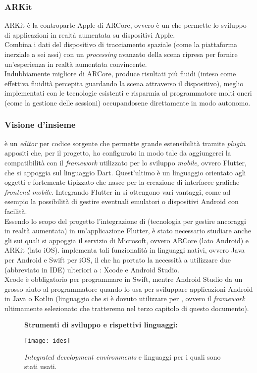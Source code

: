 \subsubsection{ARKit}
ARKit è la controparte Apple di ARCore, ovvero è un \sdk{} che permette lo sviluppo di applicazioni in realtà aumentata su dispositivi Apple.\\
Combina i dati del dispositivo di tracciamento spaziale (come la piattaforma inerziale a sei assi) con un \textit{processing} avanzato della scena ripresa per fornire un'esperienza in realtà aumentata convincente.\\
Indubbiamente migliore di ARCore, produce risultati più fluidi (inteso come effettiva fluidità percepita guardando la scena attraverso il dispositivo), meglio implementati con le tecnologie esistenti e risparmia al programmatore molti oneri (come la gestione delle sessioni) occupandosene direttamente in modo autonomo.

\subsubsection{Visione d'insieme}
\vsc{} è un \textit{editor} per codice sorgente che permette grande estensibilità tramite \textit{plugin} appositi che, per il progetto, ho configurato in modo tale da aggiungerci la compatibilità con il \textit{framework} utilizzato per lo sviluppo \textit{mobile}, ovvero Flutter, che si appoggia sul linguaggio Dart. Quest'ultimo è un linguaggio orientato agli oggetti e fortemente tipizzato che nasce per la creazione di interfacce grafiche \textit{frontend mobile}. Integrando Flutter in \vsc{} si ottengono vari vantaggi, come ad esempio la possibilità di gestire eventuali emulatori o dispositivi Android con facilità.\\
Essendo lo scopo del progetto l'integrazione di \asa{} (tecnologia per gestire ancoraggi in realtà aumentata) in un'applicazione Flutter, è stato necessario studiare anche gli \sdk{} sui quali si appoggia il servizio di Microsoft, ovvero ARCore (lato Android) e ARKit (lato iOS). \asa{} implementa tali funzionalità in linguaggi nativi, ovvero Java per Android e Swift per iOS, il che ha portato la necessità a utilizzare due \ide{}(abbreviato in IDE) ulteriori a \vsc{}: Xcode e Android Studio.\\
Xcode è obbligatorio per programmare in Swift, mentre Android Studio da un grosso aiuto al programmatore quando lo usa per sviluppare applicazioni Android in Java o Kotlin (linguaggio che si è dovuto utilizzare per \aplug{}, ovvero il \textit{framework} ultimamente selezionato che tratteremo nel terzo capitolo di questo documento).
\begin{figure}[H]
    \textbf{Strumenti di sviluppo e rispettivi linguaggi:}
    \begin{center}
    \texttt{[image: ides]}
    \caption[\textit{Integrated development environments} e linguaggi]{\textit{Integrated development environments} e linguaggi per i quali sono stati usati.}
    \end{center}
\end{figure}

